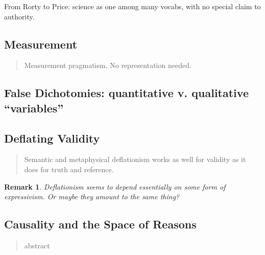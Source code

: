 \documentclass[11pt,twoside]{article}
\newtheorem{remark}{Remark}
\begin{document}
From Rorty to Price: science as one among many vocabs, with no special
claim to authority.

\subsection{Measurement}

\begin{abstract}
Measurement pragmatism.  No representation needed.
\end{abstract}

\subsection{False Dichotomies: quantitative v. qualitative ``variables''}



\subsection{Deflating Validity}

\begin{abstract}
Semantic and metaphysical deflationism works as well for validity as
it does for truth and reference.
\end{abstract}

\begin{remark}
  Deflationism seems to depend essentially on some form of
  expressivism.  Or maybe they amount to the same thing?
\end{remark}


\subsection{Causality and the Space of Reasons}

\begin{abstract}
abstract
\end{abstract}

\noindent
\cite{abell_narrative_2004} \\
\cite{crane_mental_1995} \\
\cite{gross_pragmatist_2009} \\
\cite{jackson_mental_1996} \\
\cite{lowe_causal_1993} \\
\cite{lowe_non-cartesian_2006} \\
\cite{macdonald_mental_1986} \\
\cite{menzies_causation_1993} \\
\cite{morris_causes_1986} \\
\cite{williamson_broadness_1998}
\end{document}
